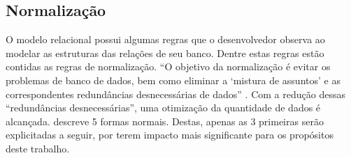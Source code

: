 
\subsection{Normalização}

O modelo relacional possui algumas regras que o desenvolvedor observa ao modelar as estruturas das relações de seu banco. Dentre estas regras estão contidas as regras de normalização. ``O objetivo da normalização é evitar os problemas de banco de dados, bem como eliminar a `mistura de assuntos' e as correspondentes redundâncias desnecessárias de dados'' \cite{machado2020banco}. Com a redução dessas ``redundâncias desnecessárias'', uma otimização da quantidade de dados é alcançada.  descreve 5 formas normais. Destas, apenas as 3 primeiras serão explicitadas a seguir, por terem impacto mais significante para os propósitos deste trabalho.

